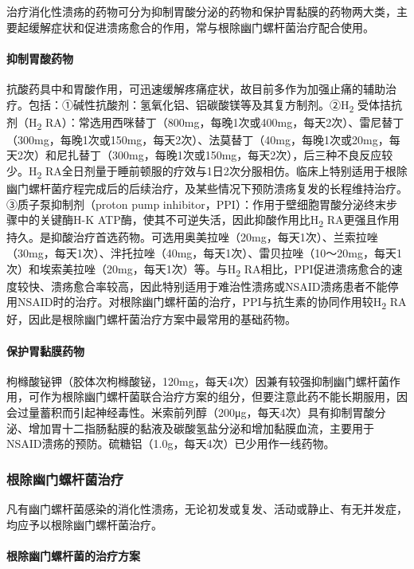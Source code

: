 治疗消化性溃疡的药物可分为抑制胃酸分泌的药物和保护胃黏膜的药物两大类，主要起缓解症状和促进溃疡愈合的作用，常与根除幽门螺杆菌治疗配合使用。

\paragraph{抑制胃酸药物}

抗酸药具中和胃酸作用，可迅速缓解疼痛症状，故目前多作为加强止痛的辅助治疗。包括：①碱性抗酸剂：氢氧化铝、铝碳酸镁等及其复方制剂。②H\textsubscript{2}
受体拮抗剂（H\textsubscript{2}
RA）：常选用西咪替丁（800mg，每晚1次或400mg，每天2次）、雷尼替丁（300mg，每晚1次或150mg，每天2次）、法莫替丁（40mg，每晚1次或20mg，每天2次）和尼扎替丁（300mg，每晚1次或150mg，每天2次），后三种不良反应较少。H\textsubscript{2}
RA全日剂量于睡前顿服的疗效与1日2次分服相仿。临床上特别适用于根除幽门螺杆菌疗程完成后的后续治疗，及某些情况下预防溃疡复发的长程维持治疗。③质子泵抑制剂（proton
pump inhibitor，PPI）：作用于壁细胞胃酸分泌终末步骤中的关键酶H-K
ATP酶，使其不可逆失活，因此抑酸作用比H\textsubscript{2}
RA更强且作用持久。是抑酸治疗首选药物。可选用奥美拉唑（20mg，每天1次）、兰索拉唑（30mg，每天1次）、泮托拉唑（40mg，每天1次）、雷贝拉唑（10～20mg，每天1次）和埃索美拉唑（20mg，每天1次）等。与H\textsubscript{2}
RA相比，PPI促进溃疡愈合的速度较快、溃疡愈合率较高，因此特别适用于难治性溃疡或NSAID溃疡患者不能停用NSAID时的治疗。对根除幽门螺杆菌的治疗，PPI与抗生素的协同作用较H\textsubscript{2}
RA好，因此是根除幽门螺杆菌治疗方案中最常用的基础药物。

\paragraph{保护胃黏膜药物}

枸橼酸铋钾（胶体次枸橼酸铋，120mg，每天4次）因兼有较强抑制幽门螺杆菌作用，可作为根除幽门螺杆菌联合治疗方案的组分，但要注意此药不能长期服用，因会过量蓄积而引起神经毒性。米索前列醇（200μg，每天4次）具有抑制胃酸分泌、增加胃十二指肠黏膜的黏液及碳酸氢盐分泌和增加黏膜血流，主要用于NSAID溃疡的预防。硫糖铝（1.0g，每天4次）已少用作一线药物。

\subsubsection{根除幽门螺杆菌治疗}

凡有幽门螺杆菌感染的消化性溃疡，无论初发或复发、活动或静止、有无并发症，均应予以根除幽门螺杆菌治疗。

\paragraph{根除幽门螺杆菌的治疗方案}

